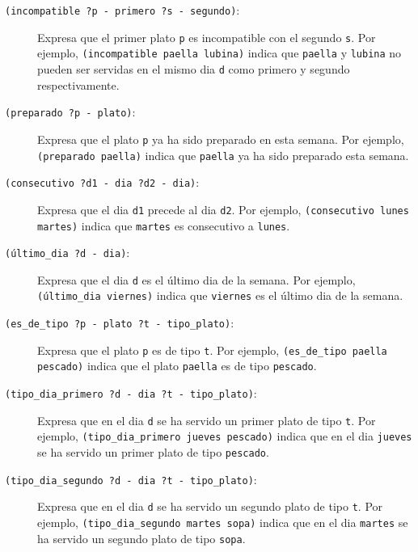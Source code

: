 \begin{description}
  \item[\texttt{(incompatible ?p - primero ?s - segundo)}:]

    Expresa que el primer plato \texttt{p} es incompatible con 
    el segundo \texttt{s}.
    Por ejemplo, \texttt{(incompatible paella lubina)} indica que
    \texttt{paella} y \texttt{lubina} no pueden ser servidas en el mismo dia
    \texttt{d} como primero y segundo respectivamente.

  \item[\texttt{(preparado ?p - plato)}:]

    Expresa que el plato \texttt{p} ya ha sido preparado en esta semana.
    Por ejemplo, \texttt{(preparado paella)} indica que
    \texttt{paella} ya ha sido preparado esta semana.

  \item[\texttt{(consecutivo ?d1 - dia  ?d2 - dia)}:]

    Expresa que el dia \texttt{d1} precede al dia \texttt{d2}.
    Por ejemplo, \texttt{(consecutivo lunes martes)} indica que
    \texttt{martes} es consecutivo a \texttt{lunes}.

  \item[\texttt{(último\_dia ?d - dia)}:]

    Expresa que el dia \texttt{d} es el último dia de la semana.
    Por ejemplo, \texttt{(último\_dia viernes)} indica que
    \texttt{viernes} es el último dia de la semana.

  \item[\texttt{(es\_de\_tipo ?p - plato ?t - tipo\_plato)}:]

    Expresa que 
    el plato \texttt{p} es de tipo \texttt{t}.
    Por ejemplo, \texttt{(es\_de\_tipo paella pescado)} indica que
    el plato \texttt{paella} es de tipo \texttt{pescado}.

  \item[\texttt{(tipo\_dia\_primero ?d - dia ?t - tipo\_plato)}:]

    Expresa que 
    en el dia \texttt{d} se ha servido un primer plato de tipo \texttt{t}.
    Por ejemplo, \texttt{(tipo\_dia\_primero jueves pescado)} indica que
    en el dia \texttt{jueves} se ha servido un primer plato
    de tipo \texttt{pescado}.

  \item[\texttt{(tipo\_dia\_segundo ?d - dia ?t - tipo\_plato)}:]

    Expresa que 
    en el dia \texttt{d} se ha servido un segundo plato de tipo \texttt{t}.
    Por ejemplo, \texttt{(tipo\_dia\_segundo martes sopa)} indica que
    en el dia \texttt{martes} se ha servido un segundo plato
    de tipo \texttt{sopa}.


\end{description}
